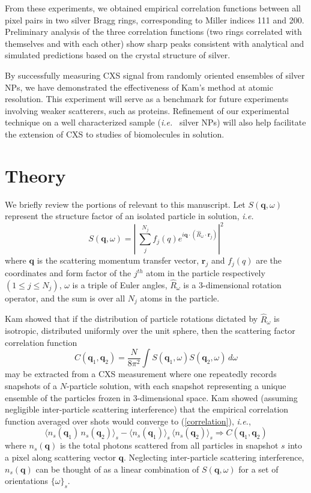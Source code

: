 \documentclass [11pt,fleqn]{article}
\def \be {\begin{equation}}
\def \ee {\end{equation}}
\begin{document}
From these experiments, we obtained empirical correlation functions between all pixel pairs in two silver Bragg rings, corresponding to Miller indices 111 and 200. Preliminary analysis of the three correlation functions (two rings correlated with themselves and with each other) show sharp peaks consistent with analytical and simulated predictions based on the crystal structure of silver.

By successfully measuring CXS signal from randomly oriented ensembles of silver NPs, we have demonstrated the effectiveness of Kam's method at atomic resolution. This experiment will serve as a benchmark for future experiments involving weaker scatterers, such as proteins. Refinement of our experimental technique on a well characterized sample (\textit{i.e.}~ silver NPs) will also help facilitate the extension of CXS to studies of biomolecules in solution.

\section{Theory}

We briefly review the portions of \cite{Kam:1977wc} relevant to this manuscript. Let $S( \bm q,\omega)$ represent the structure factor of an isolated particle in solution, \textit{i.e.}
\be \label{structurefactor}
S(\bm q,\omega) = \left| \> \sum_{j}^{N_j} f_j (q )e^{i \bm q \cdot  \left( \hat{R}_\omega \cdot \bm r_j\right)  } \right| ^{2}
\ee
where $\bm q$ is the scattering momentum transfer vector,  $\bm r_j$ and $f_j (q )$ are the coordinates and form factor of the $j^{th}$ atom in the particle respectively $( 1 \leq j \leq N_{j} )$, $\omega$ is a triple of Euler angles, $\hat{R}_\omega$ is a 3-dimensional rotation operator, and the sum is over all $N_j$ atoms in the particle.

Kam showed that if the distribution of particle rotations dictated by $\hat{R}_\omega$ is isotropic, distributed uniformly over the unit sphere, then the scattering factor correlation function
\be \label{correlation}
C(\bm q_1, \bm q_2) = \frac{N}{8 \pi^{2}}\int S( \bm q_{1},\omega ) S( \bm q_{2},\omega ) \, d \omega
\ee
may be extracted from a CXS measurement where one repeatedly records snapshots of a $N$-particle solution, with each snapshot representing a unique ensemble of the particles frozen in 3-dimensional space. Kam showed (assuming negligible inter-particle scattering interference) that the empirical correlation function averaged over shots would converge to (\ref{correlation}), \textit{i.e.},
\be \label{converge}
\big \langle   n_s(\bm q_1)  \, n_s(\bm q_2) \big \rangle_s  - \big \langle {n}_s(\bm q_1) \big \rangle_s \, \big \langle {n}_s(\bm q_2) \big \rangle_s   \Rightarrow C(\bm q_1, \bm q_2) 
\ee
where $n_{s}(\bm q)$ is the total photons scattered from all particles in snapshot $s$ into a pixel along scattering vector $\bm q$. Neglecting inter-particle scattering interference, $n_{s}(\bm q)$ can be thought of as a linear combination of $S(\bm q,\omega)$ for a set of orientations $\{ \omega\}_{s}$.
\end{document}
